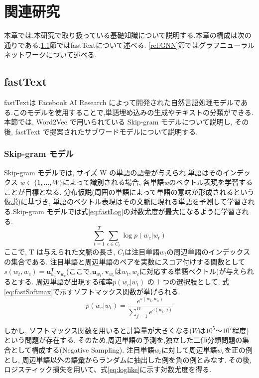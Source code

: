 \documentclass[a4j,twoside,12pt,dvipdfmx]{thesis} %
\begin{document}
\addtocounter{chapter}{+1}

\setlength{\baselineskip}{1.95zw}
\setlength{\textheight}{30\baselineskip}
\mainmatter

\fi
%
\newcommand{\argminnnn}{\mathop{\rm arg~min}\limits}
\renewcommand\thefootnote{\arabic{footnote})}
\def\vector#1{\mbox{\boldmath $#1$}}

\chapter{関連研究}\label{rel}
本章では,本研究で取り扱っている基礎知識について説明する.本章の構成は次の通りである.\ref{rel:fastText}節ではfastTextについて述べる. \ref{rel:GNN}節ではグラフニューラルネットワークについて述べる.


\section{fastText}
\label{rel:fastText}
fastText\cite{bojanowski2017enriching}は Facebook AI Research によって開発された自然言語処理モデルである.このモデルを使用することで,単語埋め込みの生成やテキストの分類ができる.
本節では, Word2Vec で用いられている Skip-gram モデルについて説明し, その後, fastText で提案されたサブワードモデルについて説明する.
\subsection{Skip-gram モデル}
Skip-gram モデルでは, サイズ W の単語の語彙が与えられ,単語はそのインデックス $w \in \{ 1,...,W \}$によって識別される場合, 各単語$w$のベクトル表現を学習することが目標となる.
分布仮説(周囲の単語によって単語の意味が形成されるという仮説)に基づき, 単語のベクトル表現はその文脈に現れる単語を予測して学習される.Skip-gram モデルでは式\ref{eq:fastLog}の対数尤度が最大になるように学習される.
\begin{equation}
  \label{eq:fastLog}
  \sum_{t=1}^{T} \sum_{c \in C_{t}} \log p(w_{c} | w_{t})
\end{equation}
ここで, T は与えられた文脈の長さ, $C_{t}$は注目単語$w_{t}$の周辺単語のインデックスの集合である.
注目単語と周辺単語のペアを実数にスコア付けする関数として$s(w_{t}, w_{c}) = \mathbf{u}_{w_{t}}^\mathsf{T}\mathbf{v}_{w_{c}}$(ここで,$\mathbf{u}_{w_{t}}, \mathbf{v}_{w_{c}}$は$w_{t}, w_{c}$に対応する単語ベクトル)が与えられるとする.
周辺単語が出現する確率$p(w_{c} | w_{t})$ の 1 つの選択肢として, 式\ref{eq:fastSoftmax}で示すソフトマックス関数が挙げられる.
\begin{equation}
  \label{eq:fastSoftmax}
  p(w_{c} | w_{t}) = \dfrac{e^{s(w_{t}, w_{c})}}{\sum_{j=1}^{W} e^{s(w_{t}, j)}}
\end{equation}
\par しかし, ソフトマックス関数を用いると計算量が大きくなる($W$は$10^5 〜 10^7$程度)という問題が存在する.
そのため,周辺単語の予測を,独立した二値分類問題の集合として構成する(Negative Sampling).
注目単語$w_{t}$に対して周辺単語$w_{c}$を正の例とし, 周辺単語以外の語彙からランダムに抽出した例を負の例とみなす.
その後,ロジスティック損失を用いて、式\ref{eq:loglike}に示す対数尤度を得る.
\end{document}
